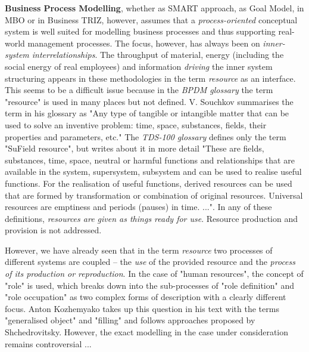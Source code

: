 \documentclass[11pt,a4paper]{article}
\begin{document}
\textbf{Business Process Modelling}, whether as SMART approach, as Goal Model,
in MBO or in Business TRIZ, however, assumes that a \emph{process-oriented}
conceptual system is well suited for modelling business processes and thus
supporting real-world management processes. The focus, however, has always
been on \emph{inner-system interrelationships}. The throughput of material,
energy (including the social energy of real employees) and information
\emph{driving} the inner system structuring appears in these methodologies in
the term \emph{resource} as an interface. This seems to be a difficult issue
because in the \emph{BPDM glossary} the term "resource" is used in many places
but not defined.  V. Souchkov summarises the term in his glossary
\cite{SouchkovGlossary} as "Any type of tangible or intangible matter that can
be used to solve an inventive problem: time, space, substances, fields, their
properties and parameters, etc." The \emph{TDS-100 glossary}
\cite{TDSGlossary} defines only the term "SuField resource", but writes about
it in more detail "These are fields, substances, time, space, neutral or
harmful functions and relationships that are available in the system,
supersystem, subsystem and can be used to realise useful functions. For the
realisation of useful functions, derived resources can be used that are formed
by transformation or combination of original resources. Universal resources
are emptiness and periods (pauses) in time. ...". In any of these definitions,
\emph{resources are given as things ready for use}. Resource production and
provision is not addressed.

However, we have already seen that in the term \emph{resource} two processes
of different systems are coupled -- the \emph{use} of the provided resource
and the \emph{process of its production or reproduction}. In the case of
"human resources", the concept of "role" is used, which breaks down into the
sub-processes of "role definition" and "role occupation" as two complex forms
of description with a clearly different focus. Anton Kozhemyako takes up this
question in his text with the terms "generalised object" and "filling" and
follows approaches proposed by Shchedrovitsky.  However, the exact modelling
in the case under consideration remains controversial ...
\end{document}

